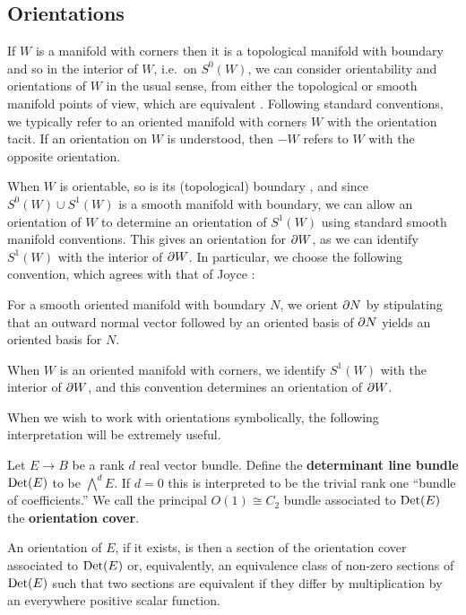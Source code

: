 \subsection{Orientations}\label{S: orientations}

If $W$ is a manifold with corners then it is a topological manifold with boundary and so in the interior of $W$, i.e.\ on $S^0(W)$, we can consider orientability and orientations of $W$ in the usual sense, from either the topological or smooth manifold points of view, which are equivalent \cite[Theorem VI.7.15]{Bred97}.
Following standard conventions, we typically refer to an oriented manifold with corners $W$ with the orientation tacit.
If an orientation on $W$ is understood, then $-W$ refers to $W$ with the opposite orientation.

When $W$ is orientable, so is its (topological) boundary \cite[Lemma 6.9.1]{Bred97}, and since $S^0(W) \cup S^1(W)$ is a smooth manifold with boundary, we can allow an orientation of $W$ to determine an orientation of $S^1(W)$ using standard smooth manifold conventions. 
This gives an orientation for $\partial W$, as we can identify $S^1(W)$ with the interior of $\partial W$. 
In particular, we choose the following convention, which agrees with that of Joyce \cite[Convention 7.2.a]{Joy12}:

\begin{convention}\label{Con: oriented boundary}
	For a smooth oriented manifold with boundary $N$, we orient $\partial N$ by stipulating that an outward normal vector followed by an oriented basis of $\partial N$ yields an oriented basis for $N$. 

	When $W$ is an oriented manifold with corners, we identify $S^1(W)$ with the interior of $\partial W$, and this convention determines an orientation of $\partial W$.
\end{convention}



When we wish to work with orientations symbolically, the following interpretation will be extremely useful.

\begin{definition}\label{D: det bundle}
	Let $E \to B$ be a rank $d$ real vector bundle.
	Define the \textbf{determinant line bundle}
	${\rm Det}(E)$ to be $\bigwedge^d E$.
	If $d = 0$ this is interpreted to be the trivial rank one ``bundle of coefficients.'' 
	We call the principal $O(1) \cong C_2$ bundle associated to ${\rm Det}(E)$ the \textbf{orientation cover}.

	An orientation of $E$, if it exists, is then a section of the orientation cover associated to ${\rm Det}(E)$ or, equivalently, an equivalence class of non-zero sections of ${\rm Det}(E)$ such that two sections are equivalent if they differ by multiplication by an everywhere positive scalar function.
\end{definition}

